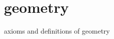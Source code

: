 \documentclass[../main.tex]{subfiles}
\begin{document}
\chapter{geometry}
axioms and definitions of geometry





\end{document}
